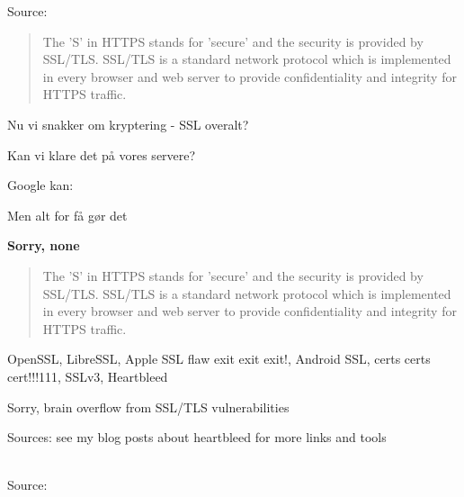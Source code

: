 \documentclass[20pt,landscape,a4paper,footrule]{foils}
\begin{document}
Source: 



\begin{quote}
The 'S' in HTTPS stands for 'secure' and the security is provided by SSL/TLS. SSL/TLS is a standard network protocol which is implemented in every browser and web server to provide confidentiality and integrity for HTTPS traffic.
\end{quote}

\begin{list1}
\item Nu vi snakker om kryptering - SSL overalt?
\item Kan vi klare det på vores servere?
\pause
\item Google kan:\\
\item Men alt for få gør det
\end{list1}


{\bf \LARGE Sorry, none}

\begin{quote}
The 'S' in HTTPS stands for 'secure' and the security is provided by SSL/TLS. SSL/TLS is a standard network protocol which is implemented in every browser and web server to provide confidentiality and integrity for HTTPS traffic.
\end{quote}

OpenSSL, LibreSSL, Apple SSL flaw exit exit exit!, Android SSL, certs certs cert!!!111, SSLv3, Heartbleed

\centerline{Sorry, brain overflow from SSL/TLS vulnerabilities}

Sources: see my blog posts about heartbleed for more links and tools\\
{\small{}\\
}



Source: 


\end{document}
